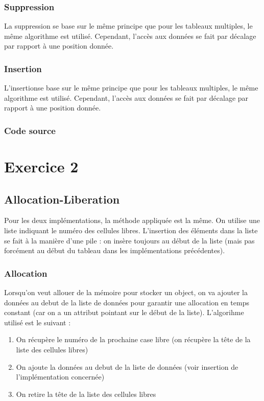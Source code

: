 \documentclass{report}
\begin{document}
      \subsection{Suppression}
        La suppression se base sur le même principe que pour les tableaux multiples, le même algorithme est utilisé. Cependant, l'accès aux données se fait par décalage par rapport à une position donnée.
      \subsection{Insertion}
        L'insertionse base sur le même principe que pour les tableaux multiples, le même algorithme est utilisé. Cependant, l'accès aux données se fait par décalage par rapport à une position donnée.
      \subsection{Code source}
        
        
  \chapter{Exercice 2}
    \section{Allocation-Liberation}
      Pour les deux implémentations, la méthode appliquée est la même. On utilise une liste indiquant le numéro des cellules libres. L'insertion des éléments dans la liste se fait à la manière d'une pile : on insère toujours au début de la liste (mais pas forcément au début du tableau dans les implémentations précédentes).
      \subsection{Allocation}
        Lorsqu'on veut allouer de la mémoire pour stocker un object, on va ajouter la données au debut de la liste de données pour garantir une allocation en temps constant (car on a un attribut pointant sur le début de la liste). 
        L'algorihme utilisé est le suivant :
        \begin{enumerate}
          \item On récupère le numéro de la prochaine case libre (on récupère la tête de la liste des cellules libres)
          \item On ajoute la données au debut de la liste de données (voir insertion de l'implémentation concernée)
          \item On retire la tête de la liste des cellules libres
        \end{enumerate}
\end{document}
